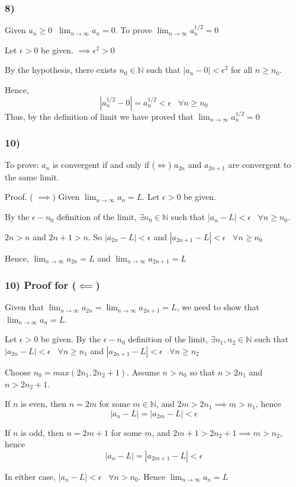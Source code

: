 \documentclass{beamer}
\begin{document}
\begin{frame}
    \frametitle{8)}
    Given \(a_{n} \ge 0 \; \; \lim_{n \rightarrow \infty} a_{n} = 0 \). 
    To prove \( \lim_{n \rightarrow \infty} a_{n}^{1/2} = 0 \) \pause

    Let $\epsilon > 0$ be given. \( \implies \epsilon^{2} > 0 \) \pause

    By the hypothesis, there exists $n_{0} \in \mathbb{N}$ such that 
    $| a_{n} - 0| < \epsilon^{2}$ for all $n \ge n_{0}$. \pause 

    Hence,
    \[|a_{n}^{1/2}-0| = a_{n}^{1/2} < \epsilon \; \; \; \forall n \ge n_{0}\] \pause
    Thus, by the definition of limit we have proved that \( \lim_{n \rightarrow \infty} a_{n}^{1/2} = 0 \)

\end{frame}

\begin{frame}
  \frametitle{10)}
  To prove: \(a_{n}\) is convergent if and only if ($ \iff $) \(a_{2n}\) and \(a_{2n+1}\) are convergent to the same limit. \pause

  Proof. ( $\implies$) Given $ \lim_{n \rightarrow \infty} a_{n} = L $.  \pause
  Let $\epsilon > 0$ be given. 
  
  By the $\epsilon - n_{0}$ definition of the limit, $ \exists n_{0} \in \mathbb{N}$ such that 
  $|a_{n} -L| < \epsilon \; \; \; \forall n \ge n_{0}$. \pause


  $2n > n $ and $2n+1 > n$. So $|a_{2n} - L | < \epsilon$ and $|a_{2n+1} - L| < \epsilon \; \; \; \forall n \ge n_{0}$  \pause

  Hence, $ \lim_{n \rightarrow \infty} a_{2n} = L $ and $ \lim_{n \rightarrow \infty} a_{2n+1} = L $

\end{frame}

\begin{frame}
  \frametitle{10)  Proof for ($\impliedby$)}
  Given that $ \lim_{n \rightarrow \infty} a_{2n} =  \lim_{n \rightarrow \infty} a_{2n+1} = L $, we need to show that $ \lim_{n \rightarrow \infty} a_{n} = L $. \pause
  
  Let $\epsilon > 0$ be given. By the $\epsilon - n_{0}$ definition of the limit, $ \exists n_{1},n_{2} \in \mathbb{N}$ such that 
  $|a_{2n} -L| < \epsilon \; \; \; \forall n \ge n_{1}$ and $|a_{2n+1} -L| < \epsilon \; \; \; \forall n \ge n_{2}$ \pause

  Choose $n_{0} = max(2n_{1},2n_{2}+1)$. Assume $n > n_{0}$ so that $n > 2n_{1}$ and $ n > 2n_{2}+1$. \pause
  
  If $n$ is even, then $ n = 2m$ for some $m \in \mathbb{N}$, and $2m>2n_{1} \implies m > n_{1}$, hence 
  \[|a_{n}-L| = |a_{2m}-L| < \epsilon\] \pause

  If $n$ is odd, then $ n = 2m+1$ for some $m$, and $2m+1>2n_{2}+1 \implies m > n_{2}$, hence 
  \[|a_{n}-L| = |a_{2m+1}-L| < \epsilon\] \pause

  In either case, $|a_{n}-L| < \epsilon \; \; \; \forall n > n_{0}$. Hence  $ \lim_{n \rightarrow \infty} a_{n} = L $

\end{frame}
\end{document}
